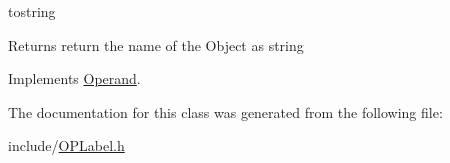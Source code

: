 tostring 

\begin{DoxyReturn}{Returns}
return the name of the Object as string 
\end{DoxyReturn}


Implements \mbox{\hyperlink{class_operand_a28aed96d5fafee66be81c30c1435ad00}{Operand}}.



The documentation for this class was generated from the following file\+:\begin{DoxyCompactItemize}
\item 
include/\mbox{\hyperlink{_o_p_label_8h}{O\+P\+Label.\+h}}\end{DoxyCompactItemize}
